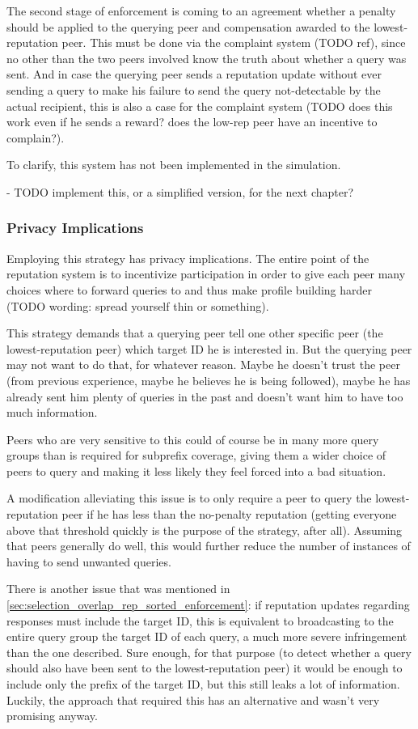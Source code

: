 The second stage of enforcement is coming to an agreement whether a penalty
should be applied to the querying peer and compensation awarded to the
lowest-reputation peer. This must be done via the complaint system (TODO ref),
since no other than the two peers involved know the truth about whether a query
was sent. And in case the querying peer sends a reputation update without ever
sending a query to make his failure to send the query not-detectable by the
actual recipient, this is also a case for the complaint system (TODO does this
work even if he sends a reward? does the low-rep peer have an incentive to
complain?).

To clarify, this system has not been implemented in the simulation.

- TODO implement this, or a simplified version, for the next chapter?

\subsubsection{Privacy Implications}
\label{sec:selection_overlap_rep_sorted_privacy}
Employing this strategy has privacy implications. The entire point of the
reputation system is to incentivize participation in order to give each peer
many choices where to forward queries to and thus make profile building harder
(TODO wording: spread yourself thin or something).

This strategy demands that a querying peer tell one other specific peer (the
lowest-reputation peer) which target ID he is interested in. But the querying
peer may not want to do that, for whatever reason. Maybe he doesn't trust the
peer (from previous experience, maybe he believes he is being followed), maybe
he has already sent him plenty of queries in the past and doesn't want him to
have too much information.

Peers who are very sensitive to this could of course be in many more query
groups than is required for subprefix coverage, giving them a wider choice of
peers to query and making it less likely they feel forced into a bad situation.

A modification alleviating this issue is to only require a peer to query the
lowest-reputation peer if he has less than the no-penalty reputation (getting
everyone above that threshold quickly is the purpose of the strategy, after
all). Assuming that peers generally do well, this would further reduce the
number of instances of having to send unwanted queries.

There is another issue that was mentioned in
\ref{sec:selection_overlap_rep_sorted_enforcement}: if reputation updates
regarding responses must include the target ID, this is equivalent to
broadcasting to the entire query group the target ID of each query, a much more
severe infringement than the one described. Sure enough, for that purpose (to
detect whether a query should also have been sent to the lowest-reputation
peer) it would be enough to include only the prefix of the target ID, but this
still leaks a lot of information. Luckily, the approach that required this has
an alternative and wasn't very promising anyway.

